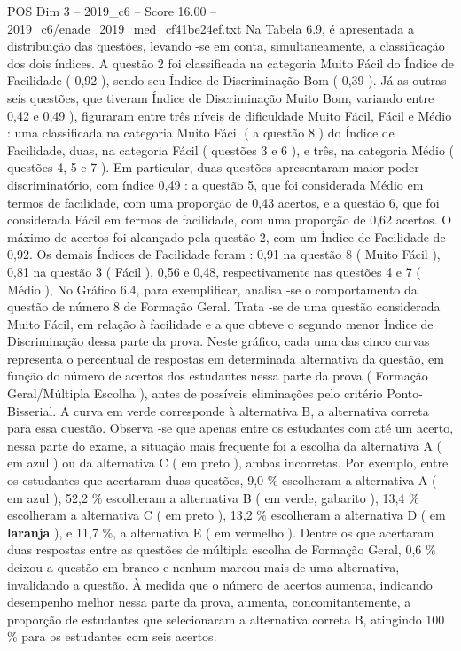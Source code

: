 \begin{textsample}{POS Dim 3 – 2019\_c6 – Score 16.00 – 2019\_c6/enade\_2019\_med\_cf41be24ef.txt}
Na Tabela 6.9, é apresentada a distribuição das questões, levando -se em conta, simultaneamente, a classificação dos dois índices.
A questão 2 foi classificada na categoria Muito Fácil do Índice de Facilidade ( 0,92 ), sendo seu Índice de Discriminação Bom ( 0,39 ).
Já as outras seis questões, que tiveram Índice de Discriminação Muito Bom, variando entre 0,42 e 0,49 ), figuraram entre três níveis de dificuldade Muito Fácil, Fácil e Médio : uma classificada na categoria Muito Fácil ( a questão 8 ) do Índice de Facilidade, duas, na categoria Fácil ( questões 3 e 6 ), e três, na categoria Médio ( questões 4, 5 e 7 ).
Em particular, duas questões apresentaram maior poder discriminatório, com índice 0,49 : a questão 5, que foi considerada Médio em termos de facilidade, com uma proporção de 0,43 acertos, e a questão 6, que foi considerada Fácil em termos de facilidade, com uma proporção de 0,62 acertos.
O máximo de acertos foi alcançado pela questão 2, com um Índice de Facilidade de 0,92.
Os demais Índices de Facilidade foram : 0,91 na questão 8 ( Muito Fácil ), 0,81 na questão 3 ( Fácil ), 0,56 e 0,48, respectivamente nas questões 4 e 7 ( Médio ), No Gráfico 6.4, para exemplificar, analisa -se o comportamento da questão de número 8 de Formação Geral.
Trata -se de uma questão considerada Muito Fácil, em relação à facilidade e a que obteve o segundo menor Índice de Discriminação dessa parte da prova.
Neste gráfico, cada uma das cinco curvas representa o percentual de respostas em determinada alternativa da questão, em função do número de acertos dos estudantes nessa parte da prova ( Formação Geral/Múltipla Escolha ), antes de possíveis eliminações pelo critério Ponto-Bisserial.
A curva em verde corresponde à alternativa B, a alternativa correta para essa questão.
Observa -se que apenas entre os estudantes com até um acerto, nessa parte do exame, a situação mais frequente foi a escolha da alternativa A ( em azul ) ou da alternativa C ( em preto ), ambas incorretas.
Por exemplo, entre os estudantes que acertaram duas questões, 9,0 \% escolheram a alternativa A ( em azul ), 52,2 \% escolheram a alternativa B ( em verde, gabarito ), 13,4 \% escolheram a alternativa C ( em preto ), 13,2 \% escolheram a alternativa D ( em \textbf{laranja} ), e 11,7 \%, a alternativa E ( em vermelho ).
Dentre os que acertaram duas respostas entre as questões de múltipla escolha de Formação Geral, 0,6 \% deixou a questão em branco e nenhum marcou mais de uma alternativa, invalidando a questão.
À medida que o número de acertos aumenta, indicando desempenho melhor nessa parte da prova, aumenta, concomitantemente, a proporção de estudantes que selecionaram a alternativa correta B, atingindo 100 \% para os estudantes com seis acertos.

\end{textsample}
